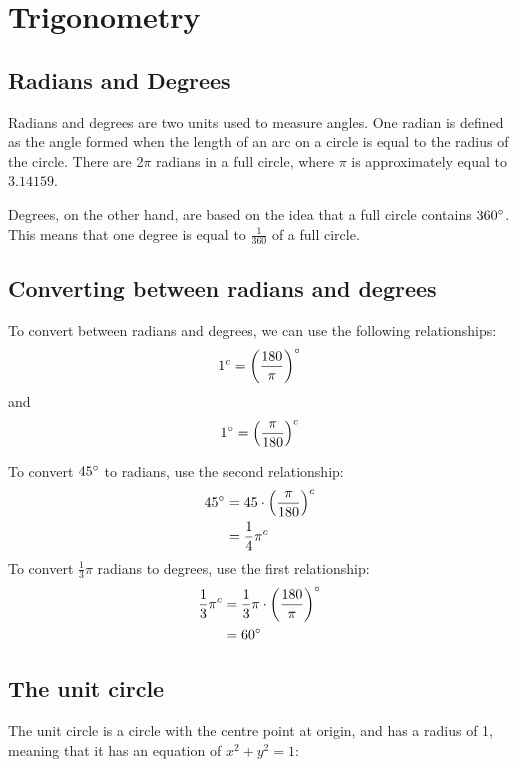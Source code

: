 \documentclass{book}
\newcommand{\rad}{^{c}}
\begin{document}
\chapter{Trigonometry}
\section{Radians and Degrees}
Radians and degrees are two units used to measure angles.  One radian is defined as the angle formed when the length of an arc on a circle is equal to the radius of the circle. There are 2$\pi$ radians in a full circle, where $\pi$ is approximately equal to $3.14159$.

Degrees, on the other hand, are based on the idea that a full circle contains $360\degree$. This means that one degree is equal to $\frac{1}{360}$ of a full circle.

\section{Converting between radians and degrees}
To convert between radians and degrees, we can use the following relationships:
\[
	1\rad = \left({\frac{180}{\pi}}\right)\degree
\]
and
\[
	1\degree = \left(\frac{\pi}{180}\right)\rad
\]

To convert $45\degree$ to radians, use the second relationship:
\begin{align*}
	45\degree & = 45 \cdot \left(\frac{\pi}{180}\right)\rad \\
	          & = \frac{1}{4}\pi\rad
\end{align*}
To convert $\frac{1}{3}\pi$ radians to degrees, use the first relationship:
\begin{align*}
	\frac{1}{3}\pi\rad & = \frac{1}{3}\pi \cdot \left(\frac{180}{\pi}\right)\degree \\
	                   & = 60\degree
\end{align*}

\section{The unit circle}
The unit circle is a circle with the centre point at origin, and has a radius of 1, meaning that it has an equation of $x^2 + y^2 = 1$:
\begin{center}
\end{center}
\end{document}
